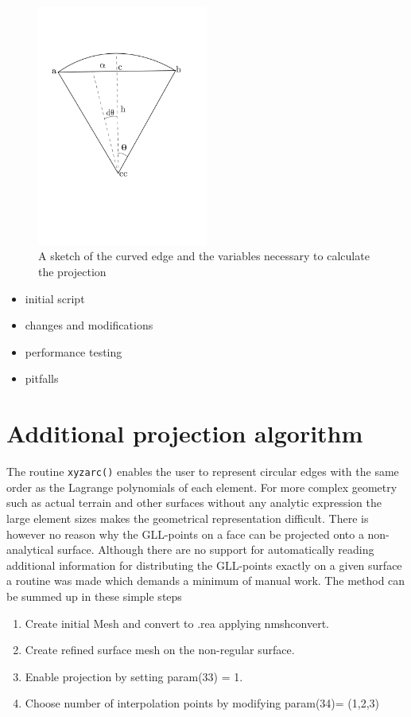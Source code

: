 \begin{figure}[h]
    \centering
    \includegraphics[width = 0.5\textwidth]{Figures/curvature.pdf}
    \caption{A sketch of the curved edge and the variables necessary to calculate the projection}
    \label{fig:curvature}
\end{figure}


\begin{itemize}
	\item initial script
	\item changes and modifications
	\item performance testing
	\item pitfalls
\end{itemize}


\section{Additional projection algorithm}\label{surfpro}
The routine \verb|xyzarc()| enables the user to represent circular edges with the same order as
the Lagrange polynomials of each element. For more complex geometry such as actual 
terrain and other surfaces without any analytic expression the large element sizes 
makes the geometrical representation difficult. There is however no reason why the 
GLL-points on a face can be projected onto a non-analytical surface. Although there
are no support for automatically reading additional information for distributing the 
GLL-points exactly on a given surface a routine was made which demands a minimum of 
manual work. The method can be summed up in these simple steps
\begin{enumerate}
    \item Create initial Mesh and convert to .rea applying nmshconvert.
        \item Create refined surface mesh on the non-regular surface.
        \item Enable projection by setting param(33) = 1.
        \item Choose number of interpolation points by modifying param(34)= (1,2,3)
\end{enumerate}

